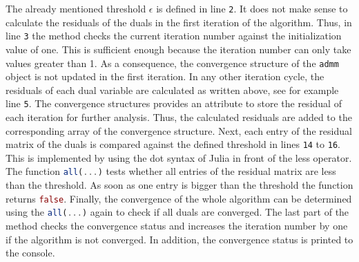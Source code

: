 The already mentioned threshold $\epsilon$ is defined in line \texttt{2}. It does not make sense to calculate the residuals of the duals in the first iteration of the algorithm. Thus, in line \texttt{3} the method checks the current iteration number against the initialization value of one. This is sufficient enough because the iteration number can only take values greater than 1. As a consequence, the convergence structure of the \lstinline[language=julia]{admm} object is not updated in the first iteration. In any other iteration cycle, the residuals of each dual variable are calculated as written above, see for example line \texttt{5}. The convergence structures provides an attribute to store the residual of each iteration for further analysis. Thus, the calculated residuals are added to the corresponding array of the convergence structure. Next, each entry of the residual matrix of the duals is compared against the defined threshold in lines \texttt{14} to \texttt{16}. This is implemented by using the dot syntax of Julia in front of the less operator. The function \lstinline[language=julia]{all(...)} tests whether all entries of the residual matrix are less than the threshold. As soon as one entry is bigger than the threshold the function returns \lstinline[language=julia]{false}. Finally, the convergence of the whole algorithm can be determined using the \lstinline[language=julia]{all(...)} again to check if all duals are converged. The last part of the method checks the convergence status and increases the iteration number by one if the algorithm is not converged. In addition, the convergence status is printed to the console.








































